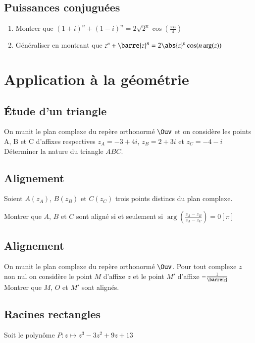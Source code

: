 \documentclass[oneside,12pt]{article}          %
\begin{document}
\subsection{Puissances conjuguées}
\begin{enumerate}
    \item Montrer que $(1+i)^n+(1-i)^n=2\sqrt{2^n}\cos\left(\frac{\pi n}{4}\right)$
    \item Généraliser en montrant que $z^n+\barre{z}^n=2\abs{z}^n\cos(n\arg(z))$
\end{enumerate}



\section{Application à la géométrie}

\subsection{Étude d'un triangle}

On munit le plan complexe du repère orthonormé $\Ouv$ et on considère les points A, B et C d'affixes respectives $z_A=-3+4i$, $z_B=2+3i$ et $z_C=-4-i$ \\
Déterminer la nature du triangle $ABC$.



\subsection{Alignement}
Soient $A(z_A)$, $B(z_B)$ et $C(z_C)$ trois points distincs du plan complexe.

Montrer que $A$, $B$ et $C$ sont aligné si et seulement si $\arg\left(\frac{z_A-z_B}{z_A-z_C}\right)=0 \left[\pi\right]$



\subsection{Alignement}
On munit le plan complexe du repère orthonormé $\Ouv$. Pour tout complexe $z$ non nul on considère le point $M$ d'affixe $z$ et le point $M'$ d'affixe $-\frac{1}{\barre{z}}$ \\
Montrer que $M$, $O$ et $M'$ sont alignés.




\subsection{Racines rectangles}
Soit le polynôme $P:z\mapsto z^3-3z^2+9z+13$
\end{document}
